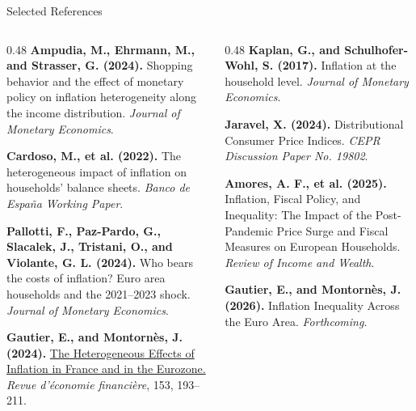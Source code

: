 \documentclass[11pt,aspectratio=169]{beamer}
\begin{document}
\begin{frame}{Selected References}
\footnotesize
\begin{columns}[T,onlytextwidth]
\begin{column}{0.48\textwidth}
\textbf{Ampudia, M., Ehrmann, M., and Strasser, G. (2024).}
Shopping behavior and the effect of monetary policy on inflation heterogeneity along the income distribution.
\textit{Journal of Monetary Economics}.
\par\vspace{.25em}
\textbf{Cardoso, M., et al. (2022).}
The heterogeneous impact of inflation on households' balance sheets.
\textit{Banco de Espa\~na Working Paper}.
\par\vspace{.25em}
\textbf{Pallotti, F., Paz-Pardo, G., Slacalek, J., Tristani, O., and Violante, G. L. (2024).}
Who bears the costs of inflation? Euro area households and the 2021--2023 shock.
\textit{Journal of Monetary Economics}.

\par\vspace{.25em}
\textbf{Gautier, E., and Montorn\`es, J. (2024).}
\href{https://www.aefr.eu/en/article/4113-the-heterogeneous-effects-of-inflation-in-france-and-in-the-eurozone}{The Heterogeneous Effects of Inflation in France and in the Eurozone.}
\textit{Revue d'\'economie financi\`ere}, 153, 193--211.
\end{column}
\begin{column}{0.48\textwidth}
\textbf{Kaplan, G., and Schulhofer-Wohl, S. (2017).}
Inflation at the household level.
\textit{Journal of Monetary Economics}.
\par\vspace{.25em}
\textbf{Jaravel, X. (2024).}
Distributional Consumer Price Indices.
\textit{CEPR Discussion Paper No. 19802}.
\par\vspace{.25em}
\textbf{Amores, A. F., et al. (2025).}
Inflation, Fiscal Policy, and Inequality: The Impact of the Post-Pandemic Price Surge and Fiscal Measures on European Households.
\textit{Review of Income and Wealth}.

\par\vspace{.25em}
\textbf{Gautier, E., and Montorn\`es, J. (2026).}
Inflation Inequality Across the Euro Area.
\textit{Forthcoming}.
\end{column}
\end{columns}
\end{frame}
\end{document}
